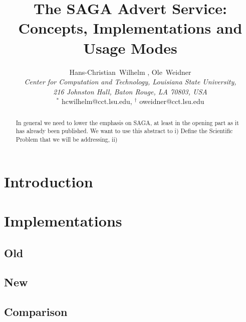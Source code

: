 \documentclass[a4paper,10pt,twocolumn]{article}
\begin{document}
\thispagestyle{plain}
\title{The SAGA Advert Service: Concepts, Implementations and Usage Modes}
\author{Hans-Christian~Wilhelm \footnotemark, Ole~Weidner\footnotemark \\ {\em \small{Center for Computation and Technology, Louisiana State University,}} \\ {\em {\small 216 Johnston Hall, Baton Rouge, LA 70803, USA}}
\\ {\footnotesize $^*$ hcwilhelm@cct.lsu.edu, $^\dag$ oweidner@cct.lsu.edu}}

\date{}

\maketitle


\begin{abstract}
In general we need to lower the emphasis on SAGA, at least in
the opening part as it has already been published. We want to use this
abstract to i) Define the Scientific Problem that we will be addressing, 
ii) 
\end{abstract}

\section{Introduction} 

\section{Implementations} 

\subsection{Old}

\subsection{New}

\subsection{Comparison}

\thispagestyle{plain}
\end{document}
